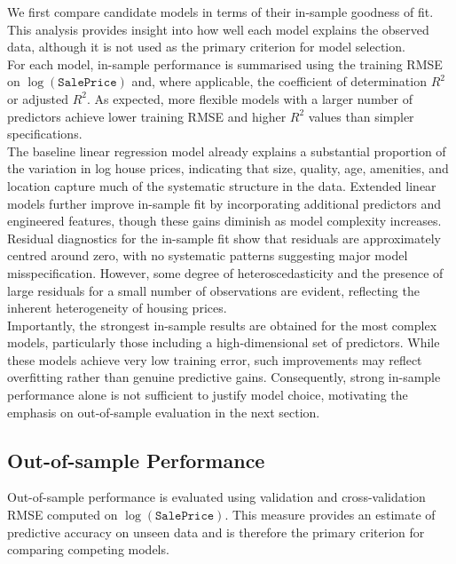 \documentclass[12pt,oneside]{article} %
\begin{document}
We first compare candidate models in terms of their in-sample goodness of fit. This analysis provides insight into how well each model explains the observed data, although it is not used as the primary criterion for model selection.\\

\noindent
For each model, in-sample performance is summarised using the training RMSE on $\log(\texttt{SalePrice})$ and, where applicable, the coefficient of determination $R^2$ or adjusted $R^2$. As expected, more flexible models with a larger number of predictors achieve lower training RMSE and higher $R^2$ values than simpler specifications.\\

\noindent
The baseline linear regression model already explains a substantial proportion of the variation in log house prices, indicating that size, quality, age, amenities, and location capture much of the systematic structure in the data. Extended linear models further improve in-sample fit by incorporating additional predictors and engineered features, though these gains diminish as model complexity increases.\\

\noindent
Residual diagnostics for the in-sample fit show that residuals are approximately centred around zero, with no systematic patterns suggesting major model misspecification. However, some degree of heteroscedasticity and the presence of large residuals for a small number of observations are evident, reflecting the inherent heterogeneity of housing prices.\\

\noindent
Importantly, the strongest in-sample results are obtained for the most complex models, particularly those including a high-dimensional set of predictors. While these models achieve very low training error, such improvements may reflect overfitting rather than genuine predictive gains. Consequently, strong in-sample performance alone is not sufficient to justify model choice, motivating the emphasis on out-of-sample evaluation in the next section.

\subsection{Out-of-sample Performance}

Out-of-sample performance is evaluated using validation and cross-validation RMSE computed on $\log(\texttt{SalePrice})$. This measure provides an estimate of predictive accuracy on unseen data and is therefore the primary criterion for comparing competing models.\\
\end{document}
